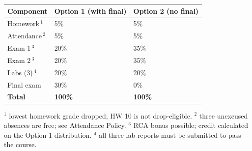 \begin{tabularx}{\textwidth}{@{}X C{0.22\textwidth} C{0.22\textwidth}@{}}
\toprule
Component & Option 1 (with final) & Option 2 (no final) \\
\midrule
Homework\,$^{1}$ & 5\% & 5\% \\
Attendance\,$^{2}$ & 5\% & 5\% \\
Exam 1\,$^{3}$ & 20\% & 35\% \\
Exam 2\,$^{3}$ & 20\% & 35\% \\
Labs (3)\,$^{4}$ & 20\% & 20\% \\
Final exam & 30\% & 0\% \\
\midrule \textbf{Total} & \textbf{100\%} & \textbf{100\%} \\
\bottomrule
\end{tabularx}
\vspace{-0.25em}
{\footnotesize $^{1}$ lowest homework grade dropped; HW 10 is not drop-eligible. $^{2}$ three unexcused absences are free; see Attendance Policy. $^{3}$ RCA bonus possible; credit calculated on the Option 1 distribution. $^{4}$ all three lab reports must be submitted to pass the course.}
